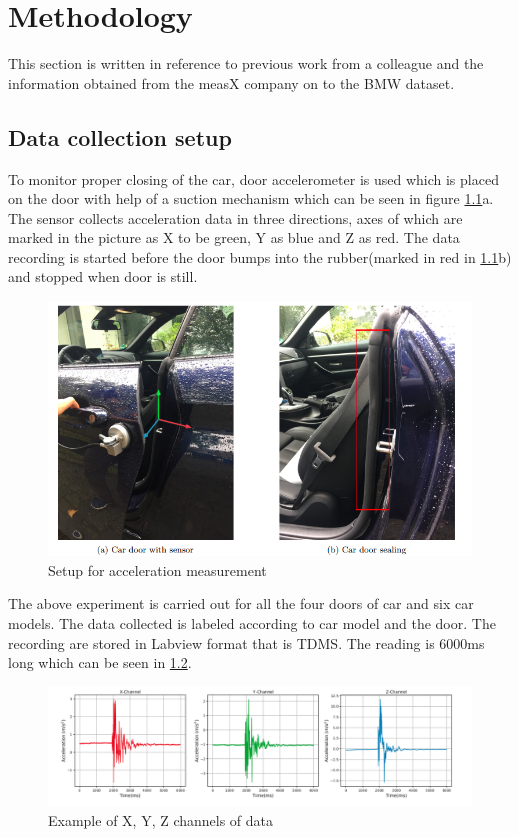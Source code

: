 

    \chapter{Methodology}
   This section is written in reference to previous work from a colleague and the information obtained from the measX company on to the BMW dataset.

    \section{Data collection setup}
    To monitor proper closing of the car, door accelerometer is used which is placed on the door with help of a suction mechanism which can be seen in figure \ref{n1}a. The sensor collects acceleration data in three directions, axes of which are marked in the picture as X to be green, Y as blue and Z as red. The data recording is started before the door bumps into the rubber(marked in red in \ref{n1}b) and stopped when door is still. 
        \begin{figure}[h]
        	\centering
        	\includegraphics[width=0.9\linewidth]{images/cardoor.png}
        	\caption{Setup for acceleration measurement}
        	\label{n1}
        \end{figure}
        
   The above experiment is carried out for all the four doors of car and six car models. The data collected is labeled according to car model and the door. The recording are stored in Labview format that is TDMS. The reading is 6000ms long which can be seen in \ref{n2}. 
   
   \begin{figure}[h]
   	\centering
   	\includegraphics[width=0.9\linewidth]{images/signal.png}
   	\caption{Example of X, Y, Z channels of data}
   	\label{n2}
   \end{figure}

